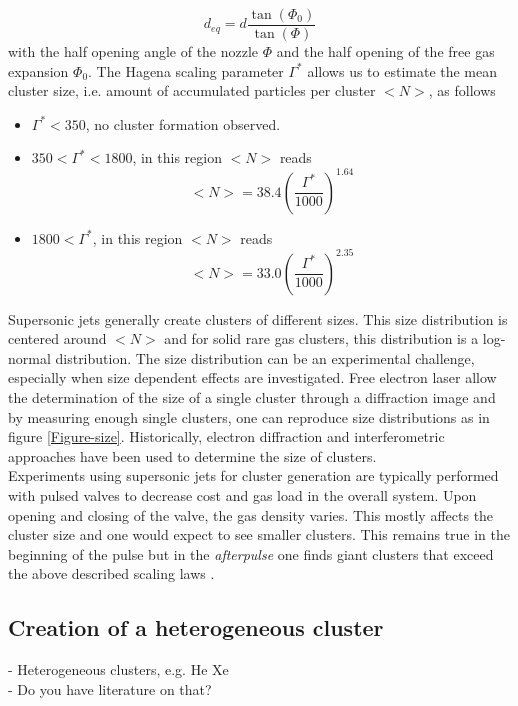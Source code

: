 \begin{equation}
d_{eq} = d\frac{\tan\left(\Phi_{0}\right)}{\tan\left(\Phi\right)}
\label{eq:equivalent-nozzle-opening}
\end{equation}
with the half opening angle of the nozzle $\Phi$ and the half opening of the free gas expansion $\Phi_{0}$. The Hagena scaling parameter $\Gamma^{*}$ allows us to estimate the mean cluster size, i.e. amount of accumulated particles per cluster $<N>$, as follows
\begin{itemize}
	\item $\Gamma^{*} < 350$, no cluster formation observed.
	\item $350 < \Gamma^{*} < 1800$, in this region $<N>$ reads
		\begin{equation}
		<N> = 38.4 \left(\frac{\Gamma^{*}}{1000}\right)^{1.64}
		\label{eq:intermediate-hagena-scaling}
		\end{equation}
	\item $1800 < \Gamma^{*}$, in this region $<N>$ reads
		\begin{equation}
		<N> = 33.0 \left(\frac{\Gamma^{*}}{1000}\right)^{2.35}
		\label{eq:}
		\end{equation}
\end{itemize}
Supersonic jets generally create clusters of different sizes. This size distribution is centered around $<N>$ and for solid rare gas clusters, this distribution is a log-normal distribution. The size distribution can be an experimental challenge, especially when size dependent effects are investigated. Free electron laser allow the determination of the size of a single cluster through a diffraction image and by measuring enough single clusters, one can reproduce size distributions as in figure \ref{Figure-size}. Historically, electron diffraction \cite{TBD} and interferometric approaches \cite{TBD} have been used to determine the size of clusters.\\
Experiments using supersonic jets for cluster generation are typically performed with pulsed valves to decrease cost and gas load in the overall system. Upon opening and closing of the valve, the gas density varies. This mostly affects the cluster size and one would expect to see smaller clusters. This remains true in the beginning of the pulse but in the \textit{afterpulse} one finds giant clusters that exceed the above described scaling laws \cite{Rupp-2014-JCP}.
%
%
%
%
%
\subsection{Creation of a heterogeneous cluster}
- Heterogeneous clusters, e.g. He Xe\\
- Do you have literature on that?
